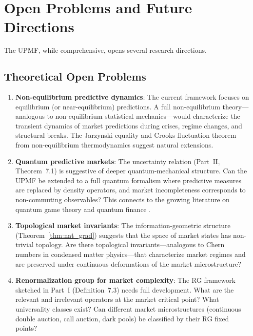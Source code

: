\documentclass[12pt,a4paper]{article}
\theoremstyle{definition}
\begin{document}

\section{Open Problems and Future Directions}\label{sec:open}

The UPMF, while comprehensive, opens several research directions.

\subsection{Theoretical Open Problems}

\begin{enumerate}
    \item \textbf{Non-equilibrium predictive dynamics}: The current framework focuses on equilibrium (or near-equilibrium) predictions. A full non-equilibrium theory---analogous to non-equilibrium statistical mechanics---would characterize the transient dynamics of market predictions during crises, regime changes, and structural breaks. The Jarzynski equality and Crooks fluctuation theorem from non-equilibrium thermodynamics \citep{jarzynski1997} suggest natural extensions.
    
    \item \textbf{Quantum predictive markets}: The uncertainty relation (Part~II, Theorem~7.1) is suggestive of deeper quantum-mechanical structure. Can the UPMF be extended to a full quantum formalism where predictive measures are replaced by density operators, and market incompleteness corresponds to non-commuting observables? This connects to the growing literature on quantum game theory and quantum finance \citep{haven2013}.
    
    \item \textbf{Topological market invariants}: The information-geometric structure (Theorem~\ref{thm:nat_grad}) suggests that the space of market states has non-trivial topology. Are there topological invariants---analogous to Chern numbers in condensed matter physics---that characterize market regimes and are preserved under continuous deformations of the market microstructure?
    
    \item \textbf{Renormalization group for market complexity}: The RG framework sketched in Part~I (Definition~7.3) needs full development. What are the relevant and irrelevant operators at the market critical point? What universality classes exist? Can different market microstructures (continuous double auction, call auction, dark pools) be classified by their RG fixed points?
    

\end{enumerate}
\end{document}
